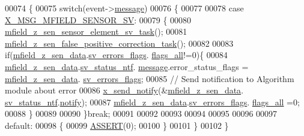 \begin{DoxyCode}
00074 \{
00075     \textcolor{keywordflow}{switch}(event->\hyperlink{a00036_adf9665938515a20c283eea2c978cf80d}{message})
00076     \{
00077 
00078         \textcolor{keywordflow}{case} \hyperlink{a00025_a510020575747f82c587c5485b8619f78}{X\_MSG\_MFIELD\_SENSOR\_SV}:
00079         \{
00080             \hyperlink{a00053_ab3b441646e86a6cf6ddfe83c1af4e075}{mfield\_z\_sen\_sensor\_element\_sv\_task}();
00081             \hyperlink{a00053_a36a65e3e838c4f7be43267a10532d318}{mfield\_z\_sen\_false\_positive\_correction\_task}();
00082 
00083             \textcolor{keywordflow}{if}(\hyperlink{a00053_ae42bea09c571df9fad890518725d5cf4}{mfield\_z\_sen\_data}.\hyperlink{a00027_aaeec6b0609dba31393f337abf1cce3d3}{sv\_errors\_flags}.
      \hyperlink{a00022_a1caa87b00c878186140c3bac9c8acf3b}{flags\_all}!=0)\{
00084              \hyperlink{a00053_ae42bea09c571df9fad890518725d5cf4}{mfield\_z\_sen\_data}.\hyperlink{a00027_a752b00333ec308e07c6bd41aa9a01e73}{sv\_status\_ntf}.
      \hyperlink{a00019_a946af134546e64739ccfd37633480dc2}{message}.error\_status\_flags = \hyperlink{a00053_ae42bea09c571df9fad890518725d5cf4}{mfield\_z\_sen\_data}.
      \hyperlink{a00027_aaeec6b0609dba31393f337abf1cce3d3}{sv\_errors\_flags};
00085              \textcolor{comment}{// Send notification to Algorithm module about error}
00086              \hyperlink{a00036_ae17b0bb16da3c471bb6074bb4c4d0fee}{x\_send\_notify}(&\hyperlink{a00053_ae42bea09c571df9fad890518725d5cf4}{mfield\_z\_sen\_data}.
      \hyperlink{a00027_a752b00333ec308e07c6bd41aa9a01e73}{sv\_status\_ntf}.\hyperlink{a00019_a8e6a04c2283f9fd7b8dcbc62faba5847}{notify});
00087              \hyperlink{a00053_ae42bea09c571df9fad890518725d5cf4}{mfield\_z\_sen\_data}.\hyperlink{a00027_aaeec6b0609dba31393f337abf1cce3d3}{sv\_errors\_flags}.
      \hyperlink{a00022_a1caa87b00c878186140c3bac9c8acf3b}{flags\_all} =0;
00088             \}
00089 
00090         \}\textcolor{keywordflow}{break};
00091 
00092 
00093 
00094 
00095 
00096 
00097         \textcolor{keywordflow}{default}:
00098         \{
00099             \hyperlink{a00072_abb8ff8e213ac9f6fb21d2b968583b936}{ASSERT}(0);
00100         \}
00101     \}
00102 \}
\end{DoxyCode}


